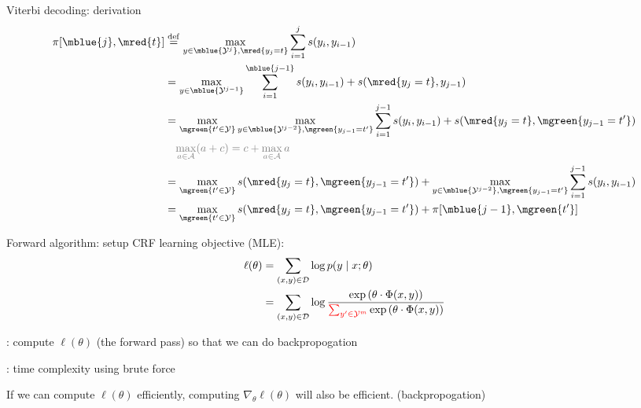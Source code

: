 \documentclass[usenames,dvipsnames,notes,11pt,aspectratio=169]{beamer}
\begin{document}
\begin{frame}
    {Viterbi decoding: derivation}
    \begin{align*}
        \pi[\mblue{j}, \mred{t}] &\eqdef \max_{y\in\mblue{\sY^j}, \mred{y_j=t}} \sum_{i=1}^j s(y_i, y_{i-1}) \\
        &= \max_{y\in\mblue{\sY^{j-1}}} \sum_{i=1}^{\mblue{j-1}} s(y_i, y_{i-1}) + s(\mred{y_j=t}, y_{j-1}) \\
        &= \max_{\mgreen{t'\in\sY}}\max_{y\in\mblue{\sY^{j-2}}, \mgreen{y_{j-1}=t'}} \sum_{i=1}^{j-1} s(y_i, y_{i-1}) + s(\mred{y_j=t}, \mgreen{y_{j-1}=t'}) \\
        & \quad \color{gray}{
            \max_{a\in\sA} (a + c) = c + \max_{a\in\sA} a
        }\\
        &= \max_{\mgreen{t'\in\sY}} s(\mred{y_j=t}, \mgreen{y_{j-1}=t'}) + 
        \max_{y\in\mblue{\sY^{j-2}}, \mgreen{y_{j-1}=t'}} \sum_{i=1}^{j-1} s(y_i, y_{i-1}) \\
        &= \max_{\mgreen{t'\in\sY}} s(\mred{y_j=t}, \mgreen{y_{j-1}=t'}) + \pi[\mblue{j-1}, \mgreen{t'}]
    \end{align*}
\end{frame}

\begin{frame}
    {Forward algorithm: setup}
    CRF learning objective (MLE):
    \begin{align*}
    \ell(\theta) &= \sum_{(x,y)\in\mathcal{D}} \log p(y\mid x; \theta) \\
    &= \sum_{(x,y)\in\mathcal{D}} \log \frac{\exp\left(  \theta\cdot\Phi(x,y)  \right)}
        {{\color{red}\sum_{y'\in\mathcal{Y}^m}}  \exp\left(  \theta\cdot\Phi(x,y)  \right)}
    \end{align*}

    : compute $\ell(\theta)$ (the forward pass) so that we can do backpropogation

    :  time complexity using brute force 

    If we can compute $\ell(\theta)$ efficiently, computing $\nabla_\theta \ell(\theta)$ will also be efficient. (backpropogation)

\end{frame}
\end{document}
